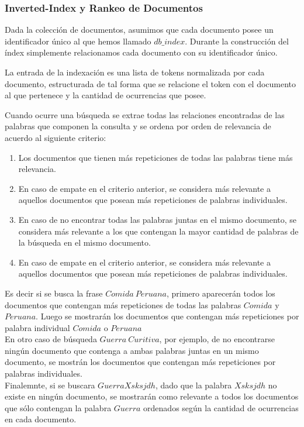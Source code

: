 \documentclass[a4paper]{article}
\begin{document}
\subsubsection{Inverted-Index y Rankeo de Documentos} 

Dada la colección de documentos, asumimos que cada documento posee un identificador único al que hemos llamado $db\_index$. Durante la construcción del índex simplemente relacionamos cada documento con su identificador único.

La entrada de la indexación es una lista de tokens normalizada por cada documento, estructurada de tal forma que se relacione el token con el documento al que pertenece y la cantidad de ocurrencias que posee.

Cuando ocurre una búsqueda se extrae todas las relaciones encontradas de las palabras que componen la consulta y se ordena por orden de relevancia de acuerdo al siguiente criterio:

\begin{enumerate}
    \item Los documentos que tienen más repeticiones de todas las palabras tiene más relevancia.
    \item En caso de empate en el criterio anterior, se considera más relevante a aquellos documentos que posean más repeticiones de palabras individuales.
    \item En caso de no encontrar todas las palabras juntas en el mismo documento, se considera más relevante a los que contengan la mayor cantidad de palabras de la búsqueda en el mismo documento.
    \item En caso de empate en el criterio anterior, se considera más relevante a aquellos documentos que posean más repeticiones de palabras individuales.
\end{enumerate}

Es decir si se busca la frase $Comida\ Peruana$, primero aparecerán todos los documentos que contengan más repeticiones de todas las palabras $Comida$ y $Peruana$. Luego se mostrarán los documentos que contengan más repeticiones por palabra individual $Comida$ o $Peruana$\\

En otro caso de búsqueda $Guerra\ Curitiva$, por ejemplo, de no encontrarse ningún documento que contenga a ambas palabras juntas en un mismo documento, se mostrán los documentos que contengan más repeticiones por palabras individuales.\\

Finalemnte, si se buscara $Guerra Xsksjdh$, dado que la palabra $Xsksjdh$ no existe en ningún documento, se mostrarán como relevante a todos los documentos que sólo contengan la palabra $Guerra$ ordenados según la cantidad de ocurrencias en cada documento.
\end{document}
